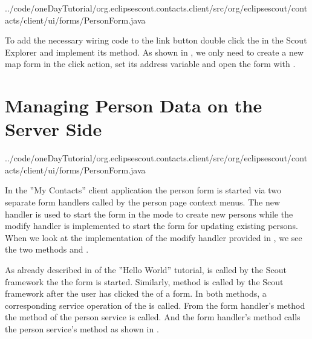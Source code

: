 \documentclass[a4paper,10pt,twoside]{book}
\begin{document}

{../code/oneDayTutorial/org.eclipsescout.contacts.client/src/org/eclipsescout/contacts/client/ui/forms/PersonForm.java}

To add the necessary wiring code to the link button double click the  in the Scout Explorer and implement its  method.
As shown in , we only need to create a new map form in the click action, set its address variable and open the form with .

\section{Managing Person Data on the Server Side}


{../code/oneDayTutorial/org.eclipsescout.contacts.client/src/org/eclipsescout/contacts/client/ui/forms/PersonForm.java}

In the ''My Contacts'' client application the person form is started via two separate form handlers called by the person page context menus. 
The new handler is used to start the form in the mode to create new persons while the modify handler is implemented to start the form for updating existing persons. 
When we look at the implementation of the modify handler provided in , we see the two methods  and . 

As already described in  of the ''Hello World'' tutorial,  is called by the Scout framework the the form is started. 
Similarly, method  is called by the Scout framework after the user has clicked the  of a form. 
In both methods, a corresponding service operation of the  is called. 
From the form handler's  method the method  of the person service is called. 
And the form handler's  method calls the person service's method  as shown in . 
\end{document}

